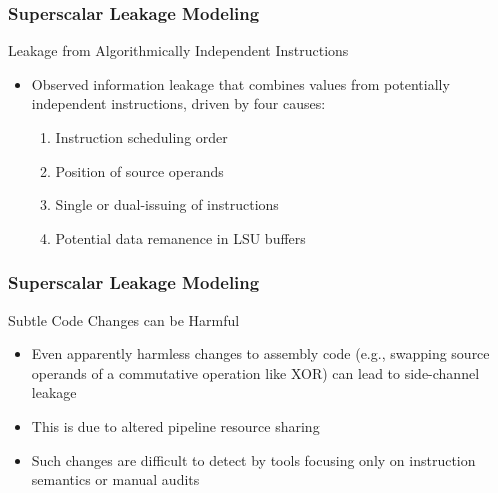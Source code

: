 \begin{frame}
    \frametitle{Superscalar Leakage Modeling}
    \begin{block}{Leakage from Algorithmically Independent Instructions}
        \begin{itemize}
            \item Observed information leakage that combines values from potentially independent instructions, driven by four causes:
                \begin{enumerate}
                    \item Instruction scheduling order
                    \item Position of source operands
                    \item Single or dual-issuing of instructions
                    \item Potential data remanence in LSU buffers
                \end{enumerate}
        \end{itemize}
    \end{block}
\end{frame}
\begin{frame}
    \frametitle{Superscalar Leakage Modeling}
    \begin{block}{Subtle Code Changes can be Harmful}
        \begin{itemize}
            \item Even apparently harmless changes to assembly code (e.g., swapping source operands of a commutative operation like XOR) can lead to side-channel leakage
            \item This is due to altered pipeline resource sharing
            \item Such changes are difficult to detect by tools focusing only on instruction semantics or manual audits
        \end{itemize}
    \end{block}
\end{frame}




